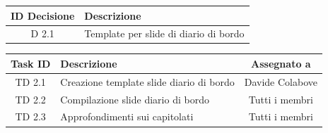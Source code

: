 \documentclass[a4paper, 11pt]{article}
\begin{document}
\begin{tabularx}{\textwidth}{|c|X|}
    \hline
    \textbf{ID Decisione} & \textbf{Descrizione} \\ \hline
    D 2.1 & Template per slide di diario di bordo \\ \hline
\end{tabularx}

\vspace{2cm}

\noindent
\begin{tabularx}{\textwidth}{|c|X|c|}
    \hline
    \textbf{Task ID} & \textbf{Descrizione} & \textbf{Assegnato a} \\ \hline
    TD 2.1 & Creazione template slide diario di bordo & Davide Colabove \\ \hline
    TD 2.2 & Compilazione slide diario di bordo & Tutti i membri \\ \hline
    TD 2.3 & Approfondimenti sui capitolati & Tutti i membri \\ \hline
\end{tabularx}
\end{document}
